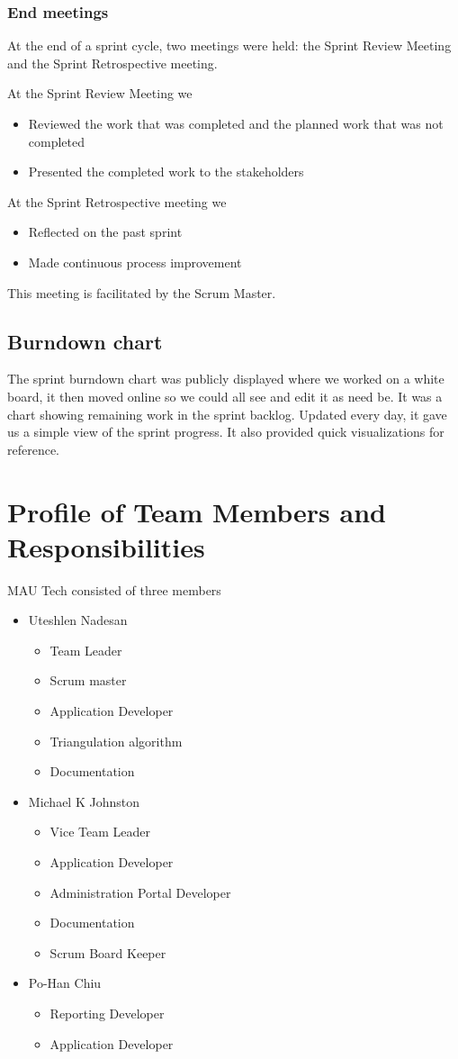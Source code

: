 \documentclass{article}
\begin{document}
\subsubsection{End meetings}
At the end of a sprint cycle, two meetings were held: the Sprint Review Meeting and the Sprint Retrospective meeting.

At the Sprint Review Meeting we
\begin{itemize}
\item Reviewed the work that was completed and the planned work that was not completed
\item Presented the completed work to the stakeholders
\end{itemize}
At the Sprint Retrospective meeting we
\begin{itemize}
\item Reflected on the past sprint
\item Made continuous process improvement
\end{itemize}
This meeting is facilitated by the Scrum Master.

\subsection{Burndown chart}
The sprint burndown chart was publicly displayed where we worked on a white board, it then moved online so we could all see and edit it as need be. It was a chart showing remaining work in the sprint backlog. Updated every day, it gave us a simple view of the sprint progress. It also provided quick visualizations for reference.

\newpage
\section{Profile of Team Members and Responsibilities}
MAU Tech consisted of three members
\begin{itemize}
\item Uteshlen Nadesan
\begin{itemize}
\item Team Leader
\item Scrum master
\item Application Developer
\item Triangulation algorithm
\item Documentation
\end{itemize}
\item Michael K Johnston
\begin{itemize}
\item Vice Team Leader
\item Application Developer
\item Administration Portal Developer
\item Documentation
\item Scrum Board Keeper
\end{itemize}
\item Po-Han Chiu
\begin{itemize}
\item Reporting Developer
\item Application Developer
\end{itemize}
\end{itemize}
\end{document}
